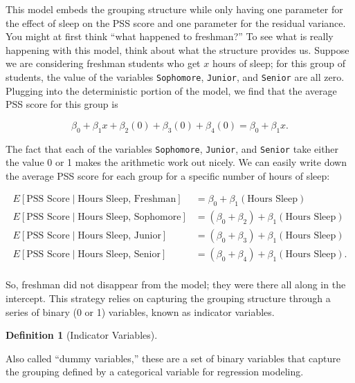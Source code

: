 \documentclass[
  letterpaper,
  DIV=11,
  numbers=noendperiod]{scrreprt}
\theoremstyle{definition}
\theoremstyle{definition}
\newtheorem{definition}{Definition}[chapter]
\theoremstyle{remark}
\begin{document}
This model embeds the grouping structure while only having one parameter
for the effect of sleep on the PSS score and one parameter for the
residual variance. You might at first think ``what happened to
freshman?'' To see what is really happening with this model, think about
what the structure provides us. Suppose we are considering freshman
students who get \(x\) hours of sleep; for this group of students, the
value of the variables \texttt{Sophomore}, \texttt{Junior}, and
\texttt{Senior} are all zero. Plugging into the deterministic portion of
the model, we find that the average PSS score for this group is

\[\beta_0 + \beta_1 x + \beta_2 (0) + \beta_3 (0) + \beta_4 (0) = \beta_0 + \beta_1 x.\]

The fact that each of the variables \texttt{Sophomore}, \texttt{Junior},
and \texttt{Senior} take either the value 0 or 1 makes the arithmetic
work out nicely. We can easily write down the average PSS score for each
group for a specific number of hours of sleep:

\[
\begin{aligned}
  E\left[\text{PSS Score} \mid \text{Hours Sleep, Freshman}\right]
    &= \beta_0 + \beta_1 (\text{Hours Sleep}) \\
  E\left[\text{PSS Score} \mid \text{Hours Sleep, Sophomore}\right]
    &= \left(\beta_0 + \beta_2\right) + \beta_1 (\text{Hours Sleep})\\
  E\left[\text{PSS Score} \mid \text{Hours Sleep, Junior}\right]
    &= \left(\beta_0 + \beta_3\right) + \beta_1 (\text{Hours Sleep}) \\
  E\left[\text{PSS Score} \mid \text{Hours Sleep, Senior}\right]
    &= \left(\beta_0 + \beta_4\right) + \beta_1 (\text{Hours Sleep}). \\
\end{aligned}
\]

So, freshman did not disappear from the model; they were there all along
in the intercept. This strategy relies on capturing the grouping
structure through a series of binary (0 or 1) variables, known as
indicator variables.

\begin{definition}[Indicator
Variables]\protect\hypertarget{def-indicator-variables}{}\label{def-indicator-variables}

Also called ``dummy variables,'' these are a set of binary variables
that capture the grouping defined by a categorical variable for
regression modeling.

\end{definition}
\end{document}

